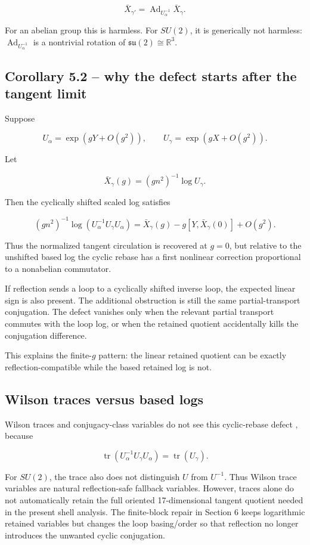 \documentclass[10pt]{article}
\begin{document}
\[
\bar X_{\gamma'}=
\operatorname{Ad}_{U_\alpha^{-1}}\bar X_\gamma.
\]

For an abelian group this is harmless.  For \(SU(2)\), it is generically not harmless: \(\operatorname{Ad}_{U_\alpha^{-1}}\) is a nontrivial rotation of \(\mathfrak{su}(2)\cong\mathbb R^3\).

\subsection{Corollary 5.2 -- why the defect starts after the tangent limit}

Suppose

\[
U_\alpha=\exp(gY+O(g^2)),
\qquad
U_\gamma=\exp(gX+O(g^2)).
\]

Let

\[
\bar X_\gamma(g)=(gn^2)^{-1}\log U_\gamma.
\]

Then the cyclically shifted scaled log satisfies

\[
(gn^2)^{-1}\log(U_\alpha^{-1}U_\gamma U_\alpha)
=
\bar X_\gamma(g)-g[Y,\bar X_\gamma(0)]+O(g^2).
\]

Thus the normalized tangent circulation is recovered at \(g=0\), but relative to the unshifted based log the cyclic rebase has a first nonlinear correction proportional to a nonabelian commutator.

If reflection sends a loop to a cyclically shifted inverse loop, the expected linear sign is also present.  The additional obstruction is still the same partial-transport conjugation.  The defect vanishes only when the relevant partial transport commutes with the loop log, or when the retained quotient accidentally kills the conjugation difference.

This explains the finite-\(g\) pattern: the linear retained quotient can be exactly reflection-compatible while the based retained log is not.

\subsection{Wilson traces versus based logs}

Wilson traces and conjugacy-class variables do not see this cyclic-rebase defect \cite{Wilson1974,Mandelstam1968,Giles1981}, because

\[
\operatorname{tr}(U_\alpha^{-1}U_\gamma U_\alpha)
=
\operatorname{tr}(U_\gamma).
\]

For \(SU(2)\), the trace also does not distinguish \(U\) from \(U^{-1}\).  Thus Wilson trace variables are natural reflection-safe fallback variables.  However, traces alone do not automatically retain the full oriented 17-dimensional tangent quotient needed in the present shell analysis.  The finite-block repair in Section 6 keeps logarithmic retained variables but changes the loop basing/order so that reflection no longer introduces the unwanted cyclic conjugation.
\end{document}
